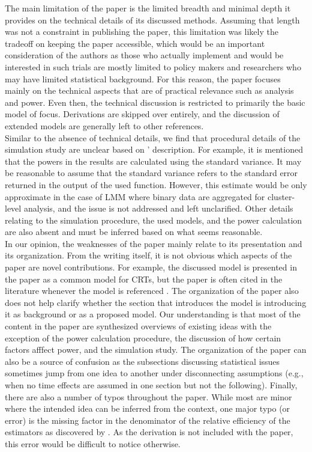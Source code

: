 \documentclass[10pt]{article}
\begin{document}
The main limitation of the paper is the limited breadth and minimal depth it provides on the technical details of its discussed methods. Assuming that length was not a constraint in publishing the paper, this limitation was likely the tradeoff on keeping the paper accessible, which would be an important consideration of the authors as those who actually implement and would be interested in such trials are mostly limited to policy makers and researchers who may have limited statistical background. For this reason, the paper focuses mainly on the technical aspects that are of practical relevance such as analysis and power. Even then, the technical discussion is restricted to primarily the basic model of focus. Derivations are skipped over entirely, and the discussion of extended models are generally left to other references.
\\

Similar to the absence of technical details, we find that procedural details of the simulation study are unclear based on \citeauthor{Hussey:2007}' description. For example, it is mentioned that the powers in the results are calculated using the standard variance. It may be reasonable to assume that the standard variance refers to the standard error returned in the output of the used function. However, this estimate would be only approximate in the case of LMM where binary data are aggregated for cluster-level analysis, and the issue is not addressed and left unclarified. Other details relating to the simulation procedure, the used models, and the power calculation are also absent and must be inferred based on what seems reasonable.
\\

In our opinion, the weaknesses of the paper mainly relate to its presentation and its organization. From the writing itself, it is not obvious which aspects of the paper are novel contributions. For example, the discussed model is presented in the paper as a common model for CRTs, but the paper is often cited in the literature whenever the model is referenced \parencite[e.g.,][]{Harrison:2020,Bowden:2021,DavisPlourde:2021}. The organization of the paper also does not help clarify whether the section that introduces the model is introducing it as background or as a proposed model. Our understanding is that most of the content in the paper are synthesized overviews of existing ideas with the exception of the power calculation procedure, the discussion of how certain factors afffect power, and the simulation study. The organization of the paper can also be a source of confusion as the subsections discussing statistical issues sometimes jump from one idea to another under disconnecting assumptions (e.g., when no time effects are assumed in one section but not the following). Finally, there are also a number of typos throughout the paper. While most are minor where the intended idea can be inferred from the context, one major typo (or error) is the missing factor in the denominator of the relative efficiency of the estimators as discovered by \textcite{Liao:2015}. As the derivation is not included with the paper, this error would be difficult to notice otherwise.
\\
\end{document}

